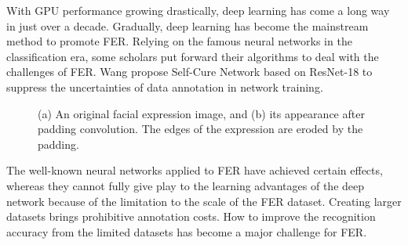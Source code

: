 \documentclass[10pt,twocolumn,letterpaper]{article}
\begin{document}
	With GPU performance growing drastically, deep learning has come a long way in just over a decade. Gradually, deep learning has become the mainstream method to promote FER. Relying on the famous neural networks in the classification era, some scholars put forward their algorithms to deal with the challenges of FER. Wang \etal \cite{scn} propose Self-Cure Network based on ResNet-18 \cite{resnet} to suppress the uncertainties of data annotation in network training.

\begin{figure}[t]


\centering
	\hspace{10mm}
	\caption{(a) An original facial expression image, and (b) its appearance after padding convolution. The edges of the expression are eroded by the padding.} 
\label{fig:padding}

\end{figure}


	The well-known neural networks applied to FER have achieved certain effects, whereas they cannot fully give play to the learning advantages of the deep network because of the limitation to the scale of the FER dataset. Creating larger datasets brings prohibitive annotation costs. How to improve the recognition accuracy from the limited datasets has become a major challenge for FER.
\end{document}

